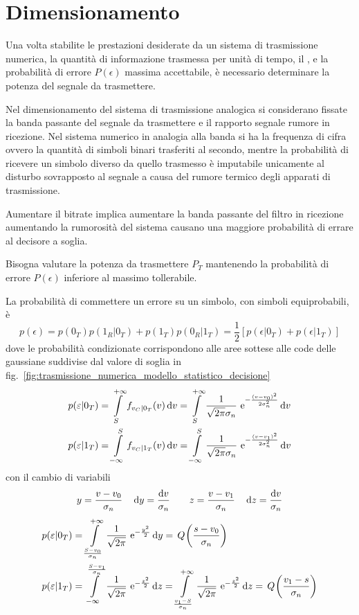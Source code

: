 \section{Dimensionamento}
Una volta stabilite le prestazioni desiderate da un sistema di trasmissione numerica, la quantità di informazione trasmessa per unità di tempo, il , e la probabilità di errore $P(\epsilon)$ massima accettabile, è necessario determinare la potenza del segnale da trasmettere.

Nel dimensionamento del sistema di trasmissione analogica si considerano fissate la banda passante del segnale da trasmettere e il rapporto segnale rumore in ricezione. Nel sistema numerico in analogia alla banda si ha la frequenza di cifra ovvero la quantità di simboli binari trasferiti al secondo, mentre la probabilità di ricevere un simbolo diverso da quello trasmesso è imputabile unicamente al disturbo sovrapposto al segnale a causa del rumore termico degli apparati di trasmissione.

Aumentare il bitrate implica aumentare la banda passante del filtro in ricezione aumentando la rumorosità del sistema causano una maggiore probabilità di errare al decisore a soglia.

Bisogna valutare la potenza da trasmettere $P_T$ mantenendo la probabilità di errore $P(\epsilon)$ inferiore al massimo tollerabile.

La probabilità di commettere un errore su un simbolo, con simboli equiprobabili, è
\begin{equation}
p(\epsilon) = p(0_T)p(1_R|0_T)+p(1_T)p(0_R|1_T) = \frac{1}{2}[p(\epsilon|0_T)+p(\epsilon|1_T)]
\end{equation}
dove le probabilità condizionate corrispondono alle aree sottese alle code delle gaussiane suddivise dal valore di soglia in fig.~\ref{fig:trasmissione_numerica_modello_statistico_decisione}
\begin{equation}
\begin{split}
p(\varepsilon|0_T)&=\int\limits_{S}^{+\infty}{f_{v_C|0_T}(v)}{\,\mathop{}\!\mathrm{d}{v}}=\int\limits_{S}^{+\infty}{\frac{1}{\sqrt{2\pi}\sigma_n}\,\operatorname{e}^{-\frac{(v-v_0)^2}{2\sigma_n^2}}}{\,\mathop{}\!\mathrm{d}{v}} \\
p(\varepsilon|1_T)&=\int\limits_{-\infty}^{S}{f_{v_C|1_T}(v)}{\,\mathop{}\!\mathrm{d}{v}}=\int\limits_{-\infty}^{S}{\frac{1}{\sqrt{2\pi}\sigma_n}\,\operatorname{e}^{-\frac{(v-v_1)^2}{2\sigma_n^2}}}{\,\mathop{}\!\mathrm{d}{v}}
\end{split}
\end{equation}
con il cambio di variabili
\[y=\frac{v-v_0}{\sigma_n}\quad \mathop{}\!\mathrm{d} y=\frac{\mathop{}\!\mathrm{d} v}{\sigma_n}\qquad z=\frac{v-v_1}{\sigma_n}\quad \mathop{}\!\mathrm{d} z=\frac{\mathop{}\!\mathrm{d} v}{\sigma_n}\]
\begin{equation}
\begin{split}
p(\varepsilon|0_T)&=\int\limits_{\frac{S-v_0}{\sigma_n}}^{+\infty}{\frac{1}{\sqrt{2\pi}}\,\operatorname{e}^{-\frac{y^2}{2}}}{\,\mathop{}\!\mathrm{d}{y}}=\,{Q}^{}\!\left({\frac{s-v_0}{\sigma_n}}\right) \\
p(\varepsilon|1_T)&=\int\limits_{-\infty}^{\frac{S-v_1}{\sigma_n}}{\frac{1}{\sqrt{2\pi}}\,\operatorname{e}^{-\frac{z^2}{2}}}{\,\mathop{}\!\mathrm{d}{z}}=\int\limits_{\frac{v_1-S}{\sigma_n}}^{+\infty}{\frac{1}{\sqrt{2\pi}}\,\operatorname{e}^{-\frac{z^2}{2}}}{\,\mathop{}\!\mathrm{d}{z}}=\,{Q}^{}\!\left({\frac{v_1-s}{\sigma_n}}\right)
\end{split}
\end{equation}

